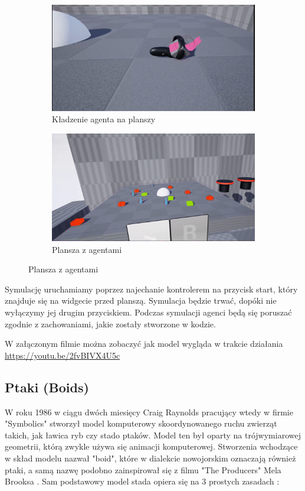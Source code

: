 \documentclass[a4paper,12pt,reqno]{article}
\begin{document}
\begin{figure}[H]%
	\centering
	\begin{subfigure}{.5\textwidth}
		\centering
		\includegraphics[width=0.8\linewidth]{graphics//agent/AgentInUE_3.png}
		\caption{Kładzenie agenta na planszy}	
		\label{ref:subref_a}
	\end{subfigure}%
	\begin{subfigure}{.5\textwidth}
		\centering
		\includegraphics[width=0.8\linewidth]{graphics//agent/AgentInUE_4.png}
		\caption{Plansza z agentami}
		\label{ref:subref_b}
	\end{subfigure}%
\label{ref:ref}
\end{figure}

Symulację uruchamiamy poprzez najechanie kontrolerem na przycisk start, który znajduje się na widgecie przed planszą. Symulacja będzie trwać, dopóki nie wyłączymy jej drugim przyciskiem. Podczas symulacji agenci będą się poruszać zgodnie z zachowaniami, jakie zostały stworzone w kodzie.

W załączonym filmie można zobaczyć jak model wygląda w trakcie działania \url{https://youtu.be/2fvBIVX4U5c}

\newpage
\subsection{Ptaki (Boids)}

W roku 1986 w ciągu dwóch miesięcy Craig Raynolds pracujący wtedy w firmie "Symbolics" stworzył model komputerowy skoordynowanego ruchu zwierząt takich, jak ławica ryb czy stado ptaków. Model ten był oparty na trójwymiarowej geometrii, którą zwykle używa się animacji komputerowej. Stworzenia wchodzące w skład modelu nazwał "boid", które w dialekcie nowojorskim oznaczają również ptaki, a samą nazwę podobno zainspirował się z filmu "The Producers" Mela Brooksa \cite{boids_name}. Sam podstawowy model stada opiera się na 3 prostych zasadach \cite{flocking_system}:
\end{document}
